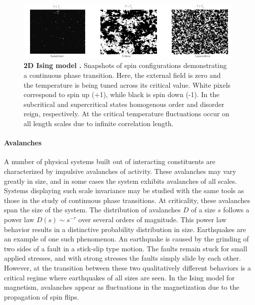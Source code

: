 \documentclass[12pt]{article}
\begin{document}
\begin{figure}      
  \begin{center}    
 \includegraphics[width=1\textwidth]{Isingchialvo}    
    \caption{\textbf{2D Ising model \cite{Chialvo2010a}.} Snapshots of spin configurations demonstrating a continuous phase transition. Here, the external field is zero and the temperature is being tuned across its critical value. White pixels correspond to spin up (+1), while black is spin down (-1). In the subcritical and supercritical states homogenous order and disorder reign, respectively. At the critical temperature fluctuations occur on all length scales due to infinite correlation length.}  
   \label{Figure::Ising model criticality}   
  \end{center}     
   \end{figure}
 
\paragraph*{Avalanches}

A number of physical systems built out of interacting constituents are characterized by impulsive avalanches of activity. These avalanches may vary greatly in size, and in some cases the system exhibits avalanches of all scales. Systems displaying such scale invariance may be studied with the same tools as those in the study of continuous phase transitions. At criticality, these avalanches span the size of the system. The distribution of avalanches $D$ of a size $s$ follows a power law $ D(s) \sim s^{-\tau} $ over several orders of magnitude. This power law behavior results in a distinctive probability distribution in size. Earthquakes are an example of one such phenomenon\cite{Sethna2011a}. An earthquake is caused by the grinding of two sides of a fault in a stick-slip type motion. The faults remain stuck for small applied stresses, and with strong stresses the faults simply slide by each other. However, at the transition between these two qualitatively different behaviors is a critical regime where earthquakes of all sizes are seen. In the Ising model for magnetism, avalanches appear as fluctuations in the magnetization due to the propagation of spin flips. 
\end{document}

